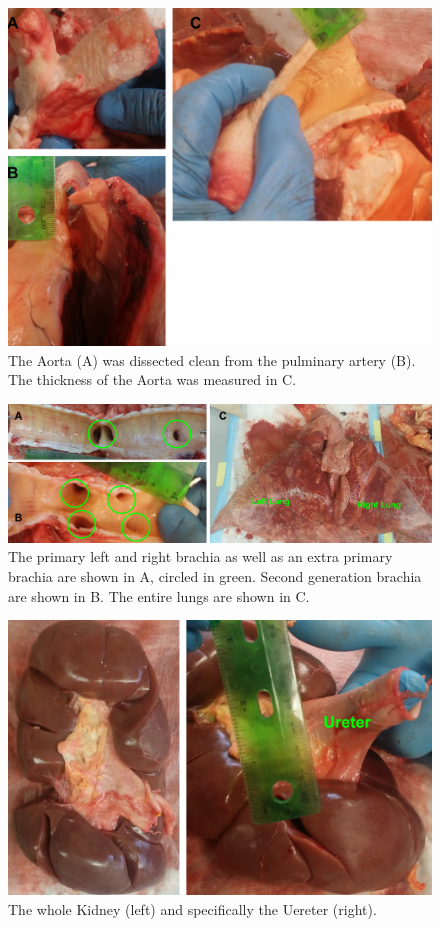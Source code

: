 \documentclass[12pt]{article}
\begin{document}
\begin{figure}[H]
	
	\centering	
	\includegraphics[width = 1\textwidth]{Figures/Heart5.png}
	\caption{The Aorta (A) was dissected clean from the pulminary artery (B). The thickness of the Aorta was measured in C.}
\end{figure}
\begin{figure}[H]
	\label{fig:L1}
	\centering	
	\includegraphics[width = 1\textwidth]{Figures/Lung1.png}
	\caption{The primary left and right brachia as well as an extra primary brachia are shown in A, circled in green. Second generation brachia are shown in B. The entire lungs are shown in C.}
	\label{fig:H5}
\end{figure}
\begin{figure}[H]
	
	\centering	
	\includegraphics[width = 1\textwidth]{Figures/Kidney1.png}
	\caption{The whole Kidney (left) and specifically the Uereter (right).}
	\label{fig:K1}
\end{figure}
\end{document}
